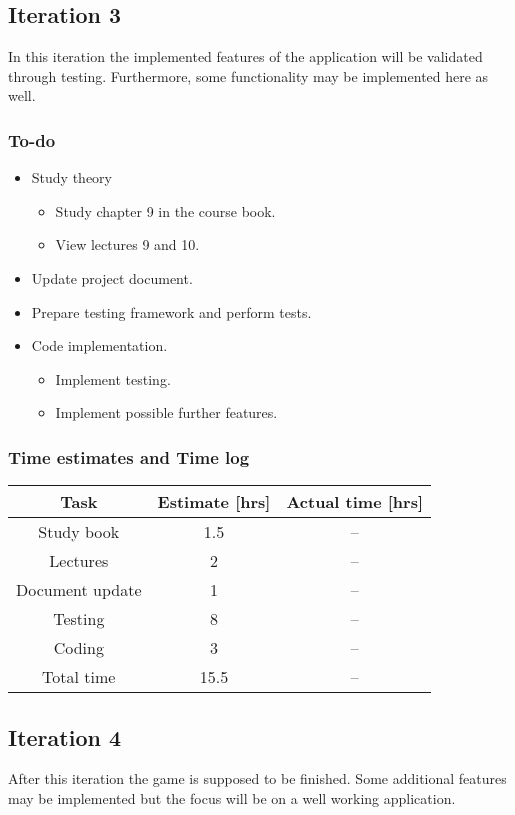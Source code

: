 \documentclass[12pt, letterpaper]{article}
\begin{document}
\subsection{Iteration 3}
In this iteration the implemented features of the application will be validated through testing. Furthermore, some functionality may be implemented here as well.
\subsubsection{To-do}
\begin{itemize}
	\item Study theory
	\begin{itemize}
		\item Study chapter 9 in the course book.
		\item View lectures 9 and 10.
	\end{itemize}
	\item Update project document.
	\item Prepare testing framework and perform tests.
	\item Code implementation.
	\begin{itemize}
		\item Implement testing.
		\item Implement possible further features.
	\end{itemize}
\end{itemize}
\subsubsection{Time estimates and Time log}
\begin{center}
	\begin{tabular}{|c|c|c|} 
		\hline
		Task & Estimate [hrs] & Actual time [hrs]\\ [0.5ex] 
		\hline\hline
		Study book & 1.5 & --\\
		\hline
		Lectures & 2 & -- \\
		\hline 
		Document update & 1 & -- \\
		\hline 
		Testing & 8 & --\\
		\hline
		Coding & 3 & --\\ 
		\hline
		Total time & 15.5 & -- \\ [1ex]
		\hline 
	\end{tabular}
\end{center}
\subsection{Iteration 4}
After this iteration the game is supposed to be finished. Some additional features may be implemented but the focus will be on a well working application.
\end{document}
